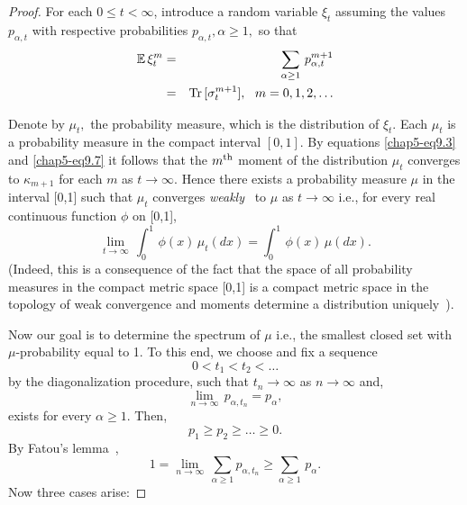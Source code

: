 \begin{proof}
For each $0\leq t<\infty$, introduce a random variable $\xi_t$ assuming the values $p_{\alpha, t}$ with respective probabilities $p_{\alpha, t}, \alpha\geq 1,$ so that 
\begin{eqnarray}
	\mathbb{E}\, \xi_t^m &=& \sum_{\alpha\geq 1}\, p_{\alpha, t}^{m+1} \notag \\
	&=& {\rm Tr}\,[\sigma_t^{m+1}],\ \ m=0,1,2,\ldots \label{chap5-eq9.7}
\end{eqnarray}

Denote by $\mu_t,$ the probability measure, which is the distribution of  $\xi_t$. Each $\mu_t$  is a probability measure in the compact interval $[0,1]$. By equations \eqref{chap5-eq9.3} and \eqref{chap5-eq9.7} it follows that the $m^{\rm th}$ moment of the distribution $\mu_t$ converges to $\kappa_{m+1}$ for each $m$ as $t\rightarrow\infty$. Hence there exists a probability measure $\mu$ in the interval [0,1] such that $\mu_t$ converges {\em weakly}~\cite{key41} to $\mu$ as $t\rightarrow \infty$ i.e., for every real continuous function $\phi$ on [0,1],  
\begin{equation}
	\underset{t\rightarrow\infty}{\lim}\, \int_0^1\, \phi(x)\, \mu_t(dx) =\int_0^1\, \phi(x)\, \mu(dx). \label{chap5-eq9.8}
\end{equation}
(Indeed, this is a consequence of the fact that the space of all probability measures in the compact metric space [0,1] is a compact metric space in the topology of weak convergence and moments determine a distribution uniquely~\cite{key41, key42}).

Now our goal is to determine the spectrum of $\mu$ i.e., the smallest closed set with $\mu$-probability equal to 1. To this end, we choose and fix a sequence 
\begin{equation}
	0< t_1< t_2<\ldots  \label{chap5-eq9.9}
\end{equation}
by the diagonalization procedure, such that $t_n\rightarrow \infty$ as $n\rightarrow \infty$ and, 
\begin{equation}
	\underset{n\rightarrow\infty}{\lim}\, p_{\alpha,t_n}=p_\alpha, \label{chap5-eq9.10}
\end{equation}
exists for every $\alpha\geq 1$. Then, 
\begin{equation}
	p_1\geq p_2\geq \ldots \geq 0.\label{chap5-eq9.11}
\end{equation}
By Fatou's lemma~\cite{key42}, 
\begin{equation}
	1=\underset{n\rightarrow\infty}{\lim}\,\sum_{\alpha\geq 1} p_{\alpha, t_n} \geq \sum_{\alpha\geq 1}\, p_\alpha. \label{chap5-eq9.12}
\end{equation}
Now three cases arise: 


\end{proof}
